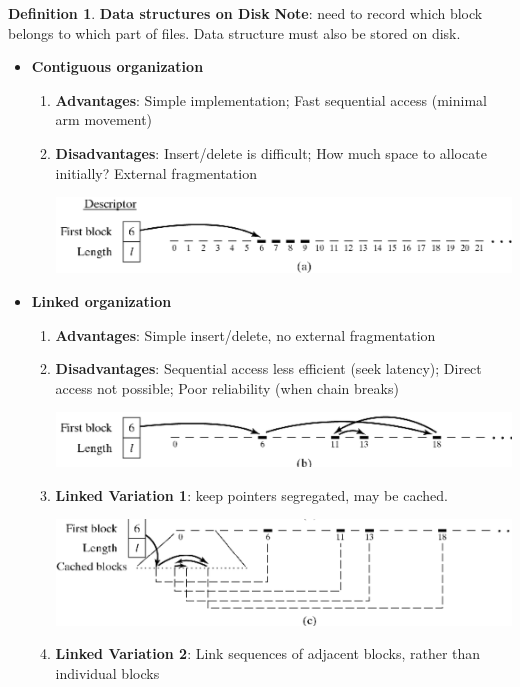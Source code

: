 \documentclass[11pt,a4paper]{article}
\theoremstyle{definition}
\newtheorem{definition}{Definition}[section]
\newenvironment{myitemize}
{ \begin{itemize}
    \setlength{\itemsep}{5pt}
    \setlength{\parskip}{0pt}
    \setlength{\parsep}{0pt}     }
{ \end{itemize}                  }
\newenvironment{myenumerate}
{ \begin{enumerate}
    \setlength{\itemsep}{5pt}
    \setlength{\parskip}{0pt}
    \setlength{\parsep}{0pt}     }
{ \end{enumerate}                }
\begin{document}
\begin{definition}{\textbf{Data structures on Disk}}
	\textbf{Note}: need to record which block belongs to which part of files. Data structure must also be stored on disk.
	\begin{myitemize}
		\item \textbf{Contiguous organization}
		\begin{myenumerate}
			\item \textbf{Advantages}: Simple implementation; Fast sequential access (minimal arm movement)
			\item \textbf{Disadvantages}: Insert/delete is difficult; How much space to allocate initially? External fragmentation

			\includegraphics[width=1.0\linewidth]{m2/contiguousOrganization}
		\end{myenumerate}
		\item \textbf{Linked organization}
		\begin{myenumerate}
			\item \textbf{Advantages}: Simple insert/delete, no external fragmentation
			\item \textbf{Disadvantages}: Sequential access less efficient (seek latency); Direct access not possible; Poor reliability (when chain breaks)

			\includegraphics[width=1.0\linewidth]{m2/linkedOrganization}
			
			\item \textbf{Linked Variation 1}: keep pointers segregated, may be cached.

			\includegraphics[width=1.0\linewidth]{m2/linkedVariation1}
			
			\item \textbf{Linked Variation 2}: Link sequences of adjacent blocks, rather than individual blocks 
			

\end{myenumerate}
\end{myitemize}
\end{definition}
\end{document}
